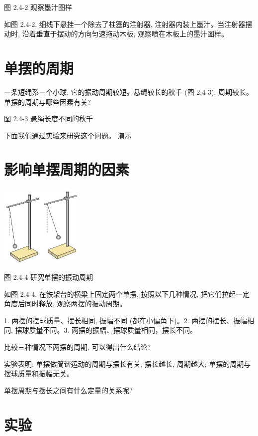 \documentclass[10pt]{article}
\begin{document}
图 2.4-2 观察墨汁图样

如图 2.4-2, 细线下悬挂一个除去了柱塞的注射器, 注射器内装上墨汁。当注射器摆动时, 沿着垂直于摆动的方向匀速拖动木板, 观察喷在木板上的墨汁图样。

\section*{单摆的周期}

一条短绳系一个小球, 它的振动周期较短。悬绳较长的秋千 (图 2.4-3), 周期较长。单摆的周期与哪些因素有关?

\begin{mdframed}

图 2.4-3 悬绳长度不同的秋千

\end{mdframed}

下面我们通过实验来研究这个问题。 演示

\section*{影响单摆周期的因素}

\begin{center}
\includegraphics[max width=0.3\textwidth]{images/01910e4c-ebb8-7d2c-8f2f-2375bc1d2d12_53_350292.jpg}
\end{center}

图 2.4-4 研究单摆的振动周期

如图 2.4-4, 在铁架台的横梁上固定两个单摆, 按照以下几种情况, 把它们拉起一定角度后同时释放, 观察两摆的振动周期。

1. 两摆的摆球质量、摆长相同, 振幅不同 (都在小偏角下)。2. 两摆的摆长、振幅相同, 摆球质量不同。3. 两摆的振幅、摆球质量相同，摆长不同。

比较三种情况下两摆的周期, 可以得出什么结论?

实验表明: 单摆做简谐运动的周期与摆长有关, 摆长越长, 周期越大; 单摆的周期与摆球质量和振幅无关。

单摆周期与摆长之间有什么定量的关系呢?

\section*{实验}
\end{document}
